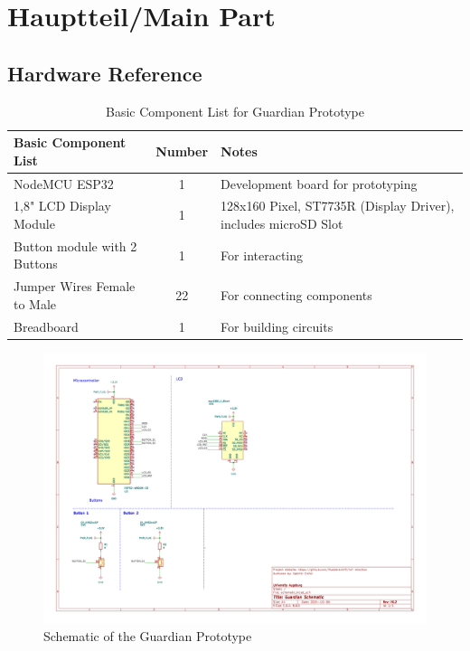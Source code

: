\chapter{Hauptteil/Main Part}




\section{Hardware Reference}

\begin{table}[h!]
    \centering
    \begin{tabular}{|l|c|p{5cm}|}
        \hline
        \textbf{Basic Component List} & \textbf{Number} & \textbf{Notes} \\
        \hline
        NodeMCU ESP32  & 1 & Development board for prototyping \\
        \hline
        1,8" LCD Display Module  & 1 & 128x160 Pixel, ST7735R (Display Driver), includes microSD Slot \\
        \hline
        Button module with 2 Buttons & 1 & For interacting \\
        \hline
		Jumper Wires Female to Male & 22 & For connecting components \\
        \hline
        Breadboard & 1 & For building circuits \\
        \hline
    \end{tabular}
    \caption{Basic Component List for Guardian Prototype}
    \label{tab:basic-component-list}
\end{table}

\begin{figure}
	\centering
	\includegraphics[scale=.5]{abbildungen/schematic.png}
	\caption{Schematic of the Guardian Prototype}
	\label{Fig:schematic}
\end{figure}

